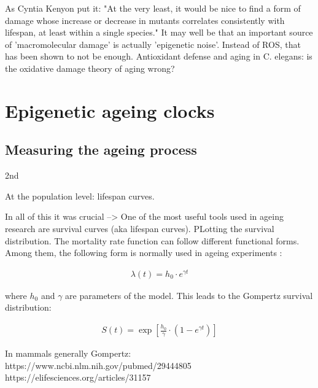 As Cyntia Kenyon put it: "At the very least, it would be nice to find a form of damage whose increase or decrease in mutants correlates consistently with lifespan, at least within a single species." \cite{Kenyon2010}
It may well be that an important source of 'macromolecular damage' is actually 'epigenetic noise'. 
Instead of ROS, that has been shown to not be enough. 
Antioxidant defense and aging in C. elegans: is the oxidative damage theory of aging wrong?

\section{Epigenetic ageing clocks}

\subsection{Measuring the ageing process}

2nd

At the population level: lifespan curves. 

In all of this it was crucial --> One of the most useful tools used in ageing research are survival curves (aka lifespan curves). PLotting the survival distribution. The mortality rate function can follow different functional forms. Among them, the following form is normally used in ageing experiments \cite{Witten1986}:

\begin{align}
\lambda(t) = h_0 \cdot e^{\gamma t}
\end{align}

where $h_0$ and $\gamma$ are parameters of the model. This leads to the Gompertz survival distribution:

\begin{align}
S(t) = \exp \left[ \frac{h_0}{\gamma} \cdot (1-e^{\gamma t}) \right]
\end{align}



In mammals generally Gompertz:
https://www.ncbi.nlm.nih.gov/pubmed/29444805
https://elifesciences.org/articles/31157 

